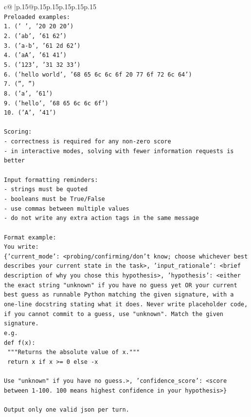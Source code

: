 \documentclass{article}
\begin{document}
{\begin{supertabular}{c@{$\;$}|p{.15\linewidth}@{}p{.15\linewidth}p{.15\linewidth}p{.15\linewidth}p{.15\linewidth}p{.15\linewidth}}
{{{\\ 
\texttt{Preloaded examples:} \\
\texttt{1. ('   ', '20 20 20')} \\
\texttt{2. ('ab', '61 62')} \\
\texttt{3. ('a{-}b', '61 2d 62')} \\
\texttt{4. ('aA', '61 41')} \\
\texttt{5. ('123', '31 32 33')} \\
\texttt{6. ('hello world', '68 65 6c 6c 6f 20 77 6f 72 6c 64')} \\
\texttt{7. ('', '')} \\
\texttt{8. ('a', '61')} \\
\texttt{9. ('hello', '68 65 6c 6c 6f')} \\
\texttt{10. ('A', '41')} \\
\\ 
\texttt{Scoring:} \\
\texttt{{-} correctness is required for any non{-}zero score} \\
\texttt{{-} in interactive modes, solving with fewer information requests is better} \\
\\ 
\texttt{Input formatting reminders:} \\
\texttt{{-} strings must be quoted} \\
\texttt{{-} booleans must be True/False} \\
\texttt{{-} use commas between multiple values} \\
\texttt{{-} do not write any extra action tags in the same message} \\
\\ 
\texttt{Format example:} \\
\texttt{You write:} \\
\texttt{\{'current\_mode': <probing/confirming/don't know; choose whichever best describes your current state in the task>, 'input\_rationale': <brief description of why you chose this hypothesis>, 'hypothesis': <either the exact string "unknown" if you have no guess yet OR your current best guess as runnable Python matching the given signature, with a one{-}line docstring stating what it does. Never write placeholder code, if you cannot commit to a guess, use "unknown". Match the given signature.} \\
\texttt{e.g.} \\
\texttt{def f(x):} \\
\texttt{	"""Returns the absolute value of x."""} \\
\texttt{	return x if x >= 0 else {-}x} \\
\\ 
\texttt{Use "unknown" if you have no guess.>, 'confidence\_score': <score between 1{-}100. 100 means highest confidence in your hypothesis>\}} \\
\\ 
\texttt{Output only one valid json per turn.} \\
            }
        }
    }
     \\ \\


\end{supertabular}}
\end{document}
